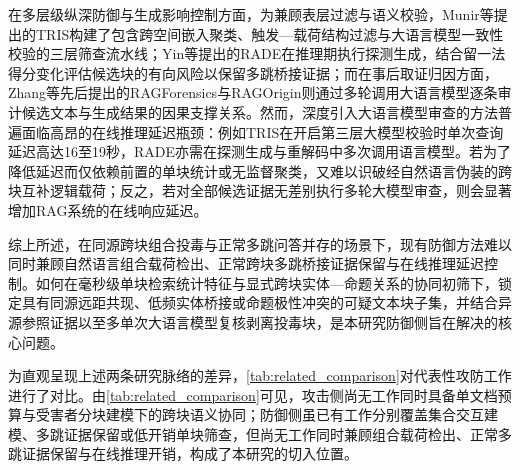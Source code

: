 
在多层级纵深防御与生成影响控制方面，为兼顾表层过滤与语义校验，Munir等\cite{munir2026tris}提出的TRIS构建了包含跨空间嵌入聚类、触发—载荷结构过滤与大语言模型一致性校验的三层筛查流水线；Yin等\cite{yin2026rade}提出的RADE在推理期执行探测生成，结合留一法得分变化评估候选块的有向风险以保留多跳桥接证据；而在事后取证归因方面，Zhang等先后提出的RAGForensics\cite{zhang2025traceback}与RAGOrigin\cite{zhang2026ragorigin}则通过多轮调用大语言模型逐条审计候选文本与生成结果的因果支撑关系。然而，深度引入大语言模型审查的方法普遍面临高昂的在线推理延迟瓶颈：例如TRIS在开启第三层大模型校验时单次查询延迟高达16至19秒，RADE亦需在探测生成与重解码中多次调用语言模型。若为了降低延迟而仅依赖前置的单块统计或无监督聚类，又难以识破经自然语言伪装的跨块互补逻辑载荷；反之，若对全部候选证据无差别执行多轮大模型审查，则会显著增加RAG系统的在线响应延迟。

综上所述，在同源跨块组合投毒与正常多跳问答并存的场景下，现有防御方法难以同时兼顾自然语言组合载荷检出、正常跨块多跳桥接证据保留与在线推理延迟控制。如何在毫秒级单块检索统计特征与显式跨块实体—命题关系的协同初筛下，锁定具有同源远距共现、低频实体桥接或命题极性冲突的可疑文本块子集，并结合异源参照证据以至多单次大语言模型复核剥离投毒块，是本研究防御侧旨在解决的核心问题。

为直观呈现上述两条研究脉络的差异，\autoref{tab:related_comparison}对代表性攻防工作进行了对比。由\autoref{tab:related_comparison}可见，攻击侧尚无工作同时具备单文档预算与受害者分块建模下的跨块语义协同；防御侧虽已有工作分别覆盖集合交互建模、多跳证据保留或低开销单块筛查，但尚无工作同时兼顾组合载荷检出、正常多跳证据保留与在线推理开销，构成了本研究的切入位置。

